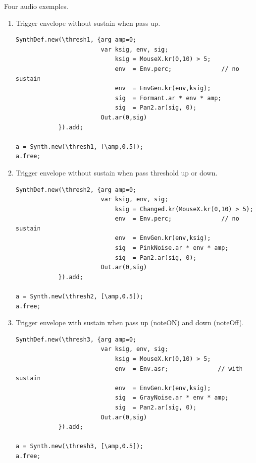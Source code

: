 Four audio exemples.

\begin{enumerate}
\def\labelenumi{\arabic{enumi}.}
\tightlist
\item Trigger envelope without sustain when pass up.
\begin{lstlisting}[frame=single] 
SynthDef.new(\thresh1, {arg amp=0;
                        var ksig, env, sig;
                            ksig = MouseX.kr(0,10) > 5;
                            env  = Env.perc;              // no sustain
                            env  = EnvGen.kr(env,ksig); 
                            sig  = Formant.ar * env * amp;
                            sig  = Pan2.ar(sig, 0); 
                        Out.ar(0,sig)
            }).add;
            
a = Synth.new(\thresh1, [\amp,0.5]);
a.free;
\end{lstlisting} 

\item Trigger envelope without sustain when pass threshold up or down.
\begin{lstlisting}[frame=single] 
SynthDef.new(\thresh2, {arg amp=0;
                        var ksig, env, sig;
                            ksig = Changed.kr(MouseX.kr(0,10) > 5);
                            env  = Env.perc;              // no sustain
                            env  = EnvGen.kr(env,ksig); 
                            sig  = PinkNoise.ar * env * amp;
                            sig  = Pan2.ar(sig, 0); 
                        Out.ar(0,sig)
            }).add;
            
a = Synth.new(\thresh2, [\amp,0.5]);
a.free;
\end{lstlisting} 

\item Trigger envelope with sustain when pass up (noteON) and down (noteOff).
\begin{lstlisting}[frame=single] 
SynthDef.new(\thresh3, {arg amp=0;
                        var ksig, env, sig;
                            ksig = MouseX.kr(0,10) > 5;
                            env  = Env.asr;              // with sustain
                            env  = EnvGen.kr(env,ksig); 
                            sig  = GrayNoise.ar * env * amp;
                            sig  = Pan2.ar(sig, 0); 
                        Out.ar(0,sig)
            }).add;

a = Synth.new(\thresh3, [\amp,0.5]);
a.free;
\end{lstlisting} 


\end{enumerate}
